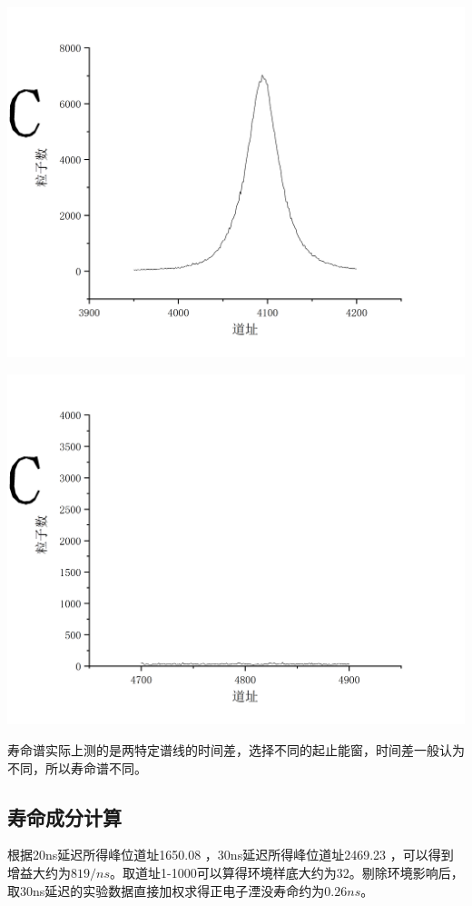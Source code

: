 \documentclass[hyperref]{ctexart}
\begin{document}
\begin{multicols}{2}
	\begin{center}\includegraphics[scale=0.3]{t13.png}\end{center}
	\begin{center}\includegraphics[scale=0.3]{t14.png}\end{center}

	寿命谱实际上测的是两特定谱线的时间差，选择不同的起止能窗，时间差一般认为不同，所以寿命谱不同。

	\subsection{寿命成分计算}
	根据20ns延迟所得峰位道址1650.08 ，30ns延迟所得峰位道址2469.23 ，可以得到增益大约为$819 /ns$。取道址1-1000可以算得环境样底大约为$32 $。剔除环境影响后，取30ns延迟的实验数据直接加权求得正电子湮没寿命约为$0.26ns $。


\end{multicols}
\end{document}
